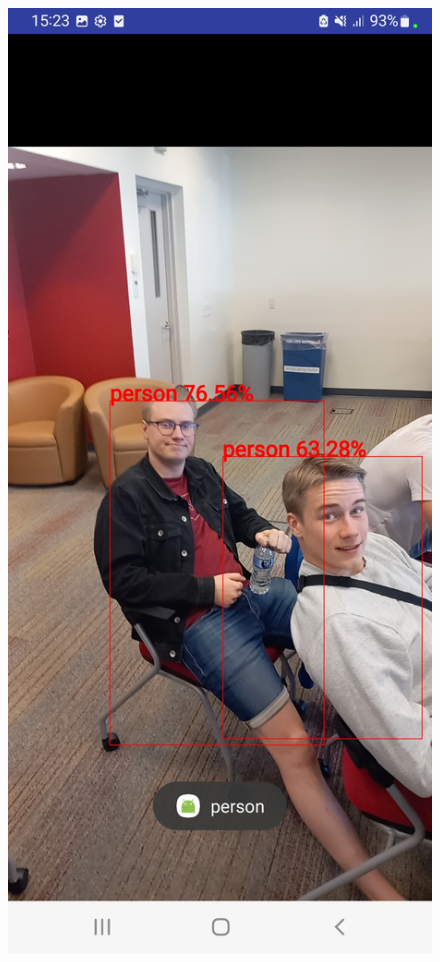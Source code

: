 \begin{figure}[H]
    \includegraphics[scale=0.11]{figure/ObjectDetection_person.jpg}

\end{figure}
